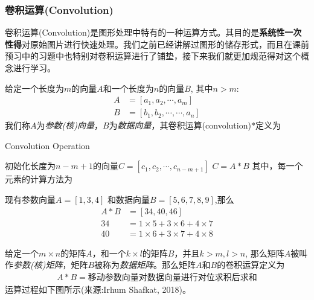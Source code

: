 \documentclass[12pt]{article}
\numberwithin{figure}{section}
\numberwithin{equation}{section}
\begin{document}
\subsubsection{卷积运算(Convolution)}

卷积运算(Convolution)是图形处理中特有的一种运算方式。其目的是\textbf{系统性一次性得}对原始图片进行快速处理。我们之前已经讲解过图形的储存形式，而且在课前预习中的习题中也特别对卷积运算进行了铺垫，接下来我们就更加规范得对这个概念进行学习。

\begin{definition}
	给定一个长度为$m$的向量$A$和一个长度为$n$的向量$B$, 其中$n > m$:
	\begin{align*}
		A & = [a_1, a_2, \cdots, a_m ] \\
		B & = [b_1, b_2, \cdots, \cdots, a_n]
	\end{align*}
	我们称$A$为\textit{参数(核)向量}，$B$为\textit{数据向量}，其卷积运算(convolution)$*$定义为
	
	\begin{algorithm}[H]
	\SetAlgoLined
	\caption{Convolution Operation}
	初始化长度为$n-m+1$的向量$C = [c_1, c_2, \cdots, c_{n-m+1}]$ \;
	$C = A * B $ \; 其中，每一个元素的计算方法为\;
	\end{algorithm}
\end{definition}

\begin{example}
	现有参数向量$A=[1, 3, 4]$ 和数据向量$B = [5, 6, 7 , 8 , 9]$,那么
	\begin{align*}
		A * B & = [34, 40, 46]\\
		34 & = 1\times 5 + 3 \times 6 + 4 \times 7 \\
		40 & = 1 \times 6 + 3 \times 7 + 4 \times 8 
	\end{align*}
\end{example}

\begin{definition}
	给定一个$m \times n$的矩阵$A$，和一个$k \times l$的矩阵$B$，并且$k > m, l > n$, 那么矩阵$A$被叫作\textit{参数(核)矩阵}，矩阵$B$被称为\textit{数据矩阵}。那么矩阵$A$和$B$的卷积运算定义为
	\begin{align*}
		A * B = \text{移动参数向量对数据向量进行对位求积后求和}
	\end{align*}
	运算过程如下图所示(来源:Irhum Shafkat, 2018)。
\end{definition}
\end{document}
